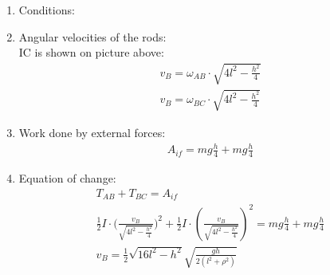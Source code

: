 \begin{enumerate}
    \item Conditions: \\
    \item Angular velocities of the rods: \\
          IC is shown on picture above: \\
          \begin{align}
              v_B = \omega_{AB} \cdot \sqrt{4l^2 - \frac{h^2}{4}} \\
              v_B = \omega_{BC} \cdot \sqrt{4l^2 - \frac{h^2}{4}}
          \end{align}
    \item Work done by external forces: \\
          \begin{align}
              A_{if} = mg \frac{h}{4} + mg \frac{h}{4}
          \end{align}
    \item Equation of change:
          \begin{align}
              T_{AB} + T_{BC} = A_{if}                                                                                                                                                  \\
              \frac{1}{2}I \cdot \big(\frac{v_B}{\sqrt{4l^2 - \frac{h^2}{4}}}\big)^2 + \frac{1}{2}I \cdot (\frac{v_B}{\sqrt{4l^2 - \frac{h^2}{4}}})^2 = mg \frac{h}{4} + mg \frac{h}{4} \\
              v_B = \frac{1}{2} \sqrt{16l^2 - h^2} \sqrt{\frac{gh}{2 (l^2 + \rho^2) }}
          \end{align}
\end{enumerate}

